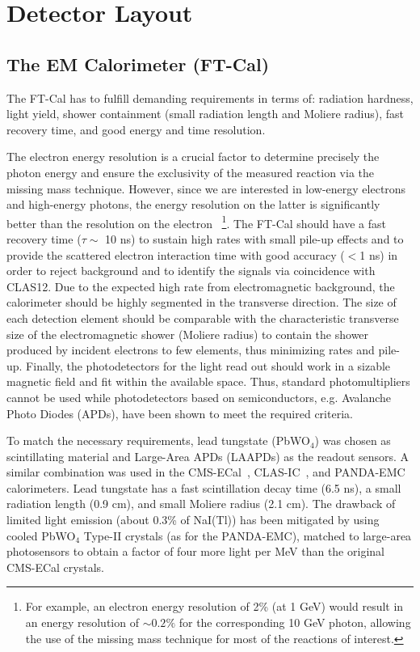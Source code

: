 \section{Detector Layout}
\subsection{The EM Calorimeter (FT-Cal)}

The FT-Cal has to  fulfill demanding requirements in terms of:  radiation hardness, light yield, shower containment (small radiation length and Moliere radius), fast recovery time, and good energy and time resolution.

The electron energy resolution is a crucial factor to determine precisely the photon energy and ensure the exclusivity of the measured reaction via the missing mass technique. However, since we are interested in low-energy electrons and high-energy photons, the energy resolution on the latter is significantly better than the resolution on the electron
~\footnote {For example, an electron energy resolution of 2\% (at 1 GeV) would result in an energy resolution of $\sim 0.2 \%$ for the corresponding 10 GeV photon, allowing  the use of the missing mass technique for  most of the  reactions of interest.}.  
The FT-Cal should  have a fast recovery time ($\tau\sim$ 10 ns) to sustain high rates with small pile-up effects and to provide the scattered electron interaction time with good accuracy ($<$1 ns) in order to reject background and to identify the signals via coincidence with CLAS12. Due to the expected high rate from electromagnetic background, the calorimeter should be highly segmented in the transverse direction. The size of each detection element
should be comparable with the characteristic transverse size of the electromagnetic shower (Moliere radius) to contain the  shower produced  by incident electrons to few elements, thus minimizing rates and pile-up. 
Finally, the photodetectors for the light read out should work  in a sizable magnetic field and fit within the available space. Thus,  standard photomultipliers cannot be used  while photodetectors based on semiconductors, e.g. Avalanche Photo Diodes (APDs),   have been shown to meet the required criteria. 

To match the necessary requirements, lead tungstate (PbWO$_4$)  was chosen as scintillating material and Large-Area APDs (LAAPDs) as the readout sensors. A similar  combination was used in the CMS-ECal~\cite{CMS-ECal}, CLAS-IC~\cite{CLAS-IC}, and PANDA-EMC~\cite{PANDA-ECal} calorimeters. Lead tungstate has a fast scintillation decay time (6.5 ns), a  small radiation length (0.9 cm), and  small Moliere radius (2.1 cm). The drawback of  limited light emission (about 0.3\% of NaI(Tl)) has been mitigated by using cooled PbWO$_4$ Type-II crystals (as for the PANDA-EMC), matched  to large-area photosensors to obtain a factor of four more light per MeV than the original CMS-ECal crystals.

